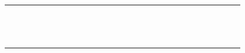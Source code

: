 \begin{tabular}{rhchchchchchchchchchchchc}
\addlinespace[2pt]
\cite{GKS+:PPL14}&&&&&&&&&&&&&&&&&&&&&&&&\\
\cite{SIMA:ASE13}&&&&&&&&&&&&&&&&&&&&&&&&\\
\cite{SRK+:IST13}&&&&&&&&&&&&&&&&&&&&&&&&\\
\cite{useGYS+:EMSE18}&&&&&&&&&&&&&&&&&&&&&&&&\\
\cite{SRA:GPCE13}&&&&&&&&&&&&&&&&&&&&&&&&\\
\addlinespace[2pt]
\cite{KMKB:ESECFSE13}&&&&&&&&&&&&&&&&&&&&&&&&\\
\cite{SKK+:ICSE12}&&&&&&&&&&&&&&&&&&&&&&&&\\
\cite{SRK+:SQJ12}&&&&&&&&&&&&&&&&&&&&&&&&\\
\cite{BMP:SERENE12}&&&&&&&&&&&&&&&&&&&&&&&&\\
\cite{useKBK:AOSD11}&&&&&&&&&&&&&&&&&&&&&&&&\\
\addlinespace[2pt]
\cite{SRKKS:APSEC08}&&&&&&&&&&&&&&&&&&&&&&&&\\
\cite{CDS:ROSATEA06}&&&&&&&&&&&&&&&&&&&&&&&&\\
\bottomrule
\end{tabular}
